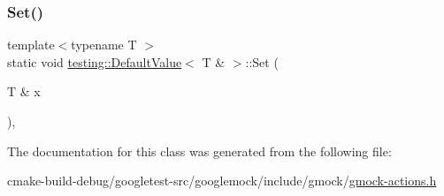 \mbox{\label{classtesting_1_1DefaultValue_3_01T_01_6_01_4_a9863abf3d311ce5007d7e57dfce2f252}} 
\subsubsection{\texorpdfstring{Set()}{Set()}}
{\footnotesize\ttfamily template$<$typename T $>$ \\
static void \mbox{\hyperlink{classtesting_1_1DefaultValue}{testing\+::\+Default\+Value}}$<$ T \& $>$\+::Set (\begin{DoxyParamCaption}\item[{T \&}]{x }\end{DoxyParamCaption})\hspace{0.3cm}{\ttfamily [inline]}, {\ttfamily [static]}}



The documentation for this class was generated from the following file\+:\begin{DoxyCompactItemize}
\item 
cmake-\/build-\/debug/googletest-\/src/googlemock/include/gmock/\mbox{\hyperlink{gmock-actions_8h}{gmock-\/actions.\+h}}\end{DoxyCompactItemize}
